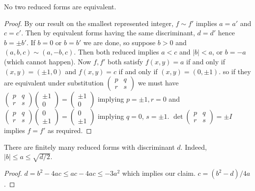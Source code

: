 \documentclass[a4paper, 10pt]{amsart}
\begin{document}
\begin{theorem}
    No two reduced forms are equivalent.
\end{theorem}

\begin{proof}
    By our result on the smallest represented integer, $f \sim f'$ implies $a = a'$ and $c = c'$. Then by equivalent forms having the same discriminant, $d = d'$ hence $b = \pm b'$. If $b = 0$ or $b = b'$ we are done, so suppose $b > 0$ and $(a, b, c) \sim (a, -b, c)$. Then both reduced implies $a < c$ and $|b| < a$, or $b = -a$ (which cannot happen). Now $f, f'$ both satisfy $f(x, y) = a$ if and only if $(x, y) = (\pm 1, 0)$ and $f(x, y) = c$ if and only if $(x, y) = (0, \pm 1)$. so if they are equivalent under substitution $\begin{pmatrix}
        p & q \\ r & s
    \end{pmatrix}$ we must have $\begin{pmatrix}
        p & q \\ r & s
    \end{pmatrix}\begin{pmatrix}
        \pm 1 \\ 0
    \end{pmatrix} = \begin{pmatrix}
        \pm 1 \\ 0
    \end{pmatrix}$
    implying $p = \pm 1, r = 0$ and $\begin{pmatrix}
        p & q \\ r & s
    \end{pmatrix}\begin{pmatrix}
       0 \\ \pm 1
    \end{pmatrix} = \begin{pmatrix}
        0 \\\pm 1
    \end{pmatrix}$ implying $q = 0$, $s = \pm 1$. $\det \begin{pmatrix}
        p & q \\ r & s
    \end{pmatrix} = \pm I$ implies $f = f'$ as required.
\end{proof}

\begin{theorem}
    There are finitely many reduced forms with discriminant $d$. Indeed, $|b| \leq a \leq \sqrt{d/2}$.
\end{theorem}
\begin{proof}
    $d = b^2 - 4ac \leq ac - 4ac \leq -3a^2$ which implies our claim. $c = (b^2 - d)/4a$.
\end{proof}
\end{document}
